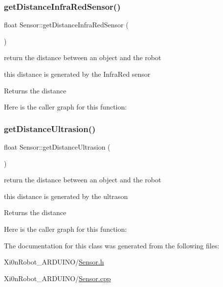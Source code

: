 \subsubsection{\texorpdfstring{get\+Distance\+Infra\+Red\+Sensor()}{getDistanceInfraRedSensor()}}
{\footnotesize\ttfamily float Sensor\+::get\+Distance\+Infra\+Red\+Sensor (\begin{DoxyParamCaption}{ }\end{DoxyParamCaption})}



return the distance between an object and the robot 

this distance is generated by the Infra\+Red sensor

\begin{DoxyReturn}{Returns}
the distance 
\end{DoxyReturn}
Here is the caller graph for this function\+:
\mbox{\label{class_sensor_ac52b531672dcadef0bc4993590d0c5d0}} 
\subsubsection{\texorpdfstring{get\+Distance\+Ultrasion()}{getDistanceUltrasion()}}
{\footnotesize\ttfamily float Sensor\+::get\+Distance\+Ultrasion (\begin{DoxyParamCaption}{ }\end{DoxyParamCaption})}



return the distance between an object and the robot 

this distance is generated by the ultrason

\begin{DoxyReturn}{Returns}
the distance 
\end{DoxyReturn}
Here is the caller graph for this function\+:


The documentation for this class was generated from the following files\+:\begin{DoxyCompactItemize}
\item 
Xi0n\+Robot\+\_\+\+A\+R\+D\+U\+I\+N\+O/\hyperlink{_sensor_8h}{Sensor.\+h}\item 
Xi0n\+Robot\+\_\+\+A\+R\+D\+U\+I\+N\+O/\hyperlink{_sensor_8cpp}{Sensor.\+cpp}\end{DoxyCompactItemize}
